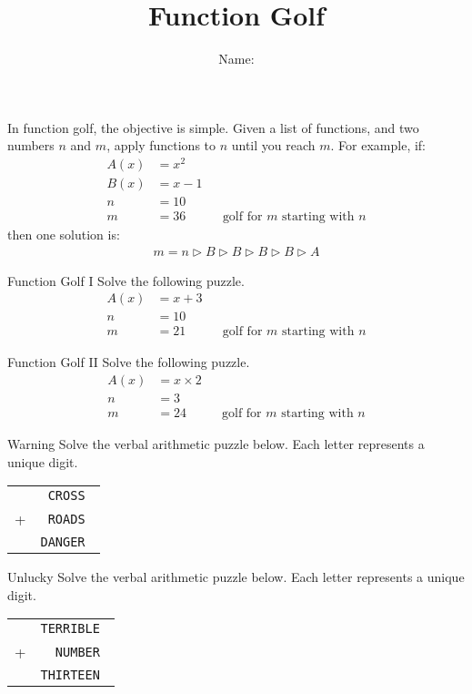 \documentclass[12pt,letterpaper]{article}
\title{Function Golf}
\author{Name: \underline{\hspace{5cm}}}
\begin{document}
\maketitle

\thispagestyle{empty}

In function golf, the objective is simple. Given a list of functions, and two
numbers $n$ and $m$, apply functions to $n$ until you reach $m$. For example,
if:
\begin{align*}
 A(x) &= x^2 \\
 B(x) &= x-1 \\
 n &= 10 \\
 m &= 36 && \text{golf for $m$ starting with $n$}
\end{align*}
then one solution is:
\begin{align*}
 m = n \rhd B \rhd B \rhd B \rhd B \rhd A
\end{align*}

\begin{problem}{Function Golf I}
 Solve the following puzzle.
 \begin{align*}
  A(x) &= x + 3 \\
  n &= 10 \\
  m &= 21 && \text{golf for $m$ starting with $n$}
 \end{align*}
\end{problem}

\begin{problem}{Function Golf II}
 Solve the following puzzle.
 \begin{align*}
  A(x) &= x \times 2 \\
  n &= 3 \\
  m &= 24 && \text{golf for $m$ starting with $n$}
 \end{align*}
\end{problem}

\begin{problem}{Warning}
Solve the verbal arithmetic puzzle below. Each letter represents a unique digit.

\begin{center}
 \begin{tabular}{rr}
  & \tt CROSS \\
  + & \tt ROADS \\
  \hline
  & \tt DANGER
 \end{tabular}
\end{center}
\end{problem}

\begin{problem}{Unlucky}
Solve the verbal arithmetic puzzle below. Each letter represents a unique digit.

\begin{center}
 \begin{tabular}{rr}
  & \tt TERRIBLE \\
  + & \tt NUMBER \\
  \hline
  & \tt THIRTEEN
 \end{tabular}
\end{center}
\end{problem}
\end{document}
